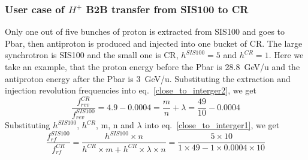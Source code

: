 %
%
\subsubsection{User case of $H^{+}$ B2B transfer from SIS100 to CR} 
Only one out of five bunches of proton is extracted from SIS100 and goes to Pbar, then antiproton is produced and  injected into one bucket of CR. The large synchrotron is SIS100 and the small one is CR, $h^{SIS100}=5$ and $h^{CR}=1$. Here we take an example, that the proton energy before the Pbar is \SI{28.8}{GeV/\atomicmassunit} and the antiproton energy after the Pbar is \SI{3}{GeV/\atomicmassunit}. Substituting the extraction and injection revolution frequencies into eq.~\ref{close_to_interger2}, we get
\begin{equation} 
\frac{f_{rev}^{CR}}{f_{rev}^{SIS100}}=4.9-0.0004=\frac{m}{n}+ \lambda=\frac{49}{10}-0.0004
\end{equation}
Substituting $h^{SIS100}$, $h^{CR}$, m, n and $\lambda$ into eq.~\ref{close_to_interger1}, we get
\begin{equation} 
\frac{f_{rf}^{SIS100}}{f_{rf}^{CR}}=\frac{h^{SIS100}\times n}{h^{CR} \times m+ h^{CR} \times\lambda\times n}=\frac{5\times 10}{1 \times 49- 1 \times0.0004\times 10}
\end{equation}

